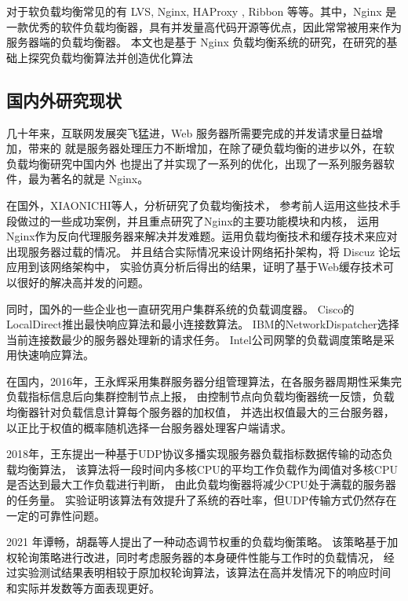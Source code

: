 对于软负载均衡常见的有 LVS\cite{lijp}, Nginx\cite{Zepeng}, HAProxy\cite{li2019dynamic} , Ribbon 等等。其中，Nginx 是一款优秀的软件负载均衡器，具有并发量高代码开源等优点，因此常常被用来作为服务器端的负载均衡器。
本文也是基于 Nginx 负载均衡系统的研究，在研究的基础上探究负载均衡算法并创造优化算法

\subsection{国内外研究现状}

几十年来，互联网发展突飞猛进，Web 服务器所需要完成的并发请求量日益增加，带来的
就是服务器处理压力不断增加，在除了硬负载均衡的进步以外，在软负载均衡研究中国内外
也提出了并实现了一系列的优化，出现了一系列服务器软件，最为著名的就是 Nginx。

在国外，XIAONICHI等人\cite{chi2012web}，分析研究了负载均衡技术，
参考前人运用这些技术手段做过的一些成功案例，并且重点研究了Nginx的主要功能模块和内核，
运用Nginx作为反向代理服务器来解决并发难题。运用负载均衡技术和缓存技术来应对出现服务器过载的情况。
并且结合实际情况来设计网络拓扑架构，将 Discuz 论坛应用到该网络架构中，
实验仿真分析后得出的结果，证明了基于Web缓存技术可以很好的解决高并发的问题。

同时，国外的一些企业也一直研究用户集群系统的负载调度器。
Cisco的LocalDirect推出最快响应算法和最小连接数算法。
IBM的NetworkDispatcher选择当前连接数最少的服务器处理新的请求任务。
Intel公司网擎的负载调度策略是采用快速响应算法\cite{张淇2020服务器集群负载均衡算法在商务系统中的研究与应用}。

在国内，2016年，王永辉采用集群服务器分组管理算法，在各服务器周期性采集完负载指标信息后向集群控制节点上报，
由控制节点向负载均衡器统一反馈，负载均衡器针对负载信息计算每个服务器的加权值，
并选出权值最大的三台服务器，以正比于权值的概率随机选择一台服务器处理客户端请求\cite{王永辉2015基于}。

2018年，王东提出一种基于UDP协议多播实现服务器负载指标数据传输的动态负载均衡算法，
该算法将一段时间内多核CPU的平均工作负载作为阈值对多核CPU是否达到最大工作负载进行判断，
由此负载均衡器将减少CPU处于满载的服务器的任务量\cite{王东2018动态反馈负载均衡策略的研究}。
实验证明该算法有效提升了系统的吞吐率，但UDP传输方式仍然存在一定的可靠性问题。

2021 年谭畅，胡磊等人\cite{谭畅2021云中心基于}提出了一种动态调节权重的负载均衡策略。
该策略基于加权轮询策略进行改进，同时考虑服务器的本身硬件性能与工作时的负载情况，
经过实验测试结果表明相较于原加权轮询算法，该算法在高并发情况下的响应时间
和实际并发数等方面表现更好。

